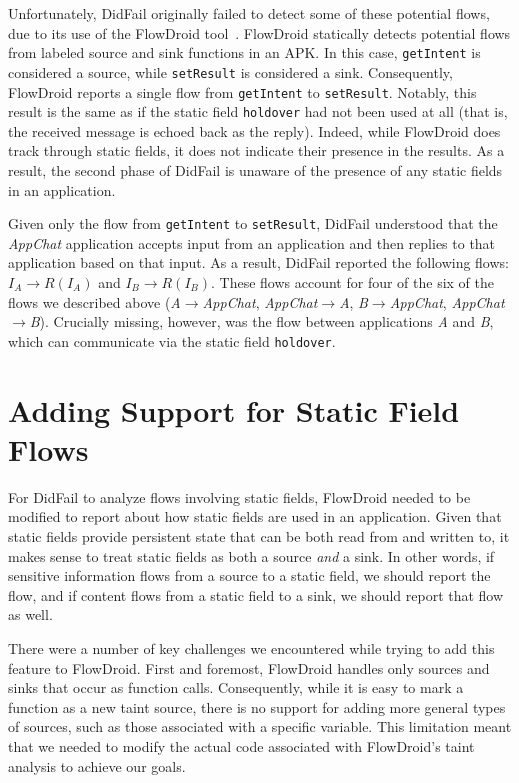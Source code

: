 Unfortunately, DidFail originally failed to detect some of these potential flows, due to its use of the FlowDroid tool~\cite{flowdroid}. FlowDroid statically detects potential flows from labeled source and sink functions in an APK. In this case, \texttt{getIntent} is considered a source, while \texttt{setResult} is considered a sink. Consequently, FlowDroid reports a single flow from \texttt{getIntent} to \texttt{setResult}. Notably, this result is the same as if the static field \texttt{holdover} had not been used at all (that is, the received message is echoed back as the reply). Indeed, while FlowDroid does track through static fields, it does not indicate their presence in the results. As a result, the second phase of DidFail is unaware of the presence of any static fields in an application.

Given only the flow from \texttt{getIntent} to \texttt{setResult}, DidFail understood that the \emph{AppChat} application accepts input from an application and then replies to that application based on that input. As a result, DidFail reported the following flows: $I_A\rightarrow R(I_A)$ and $I_B\rightarrow R(I_B)$. These flows account for four of the six of the flows we described above (\emph{A$\rightarrow$AppChat}, \emph{AppChat$\rightarrow$A}, \emph{B$\rightarrow$AppChat}, \emph{AppChat$\rightarrow$B}). Crucially missing, however, was the flow between applications \emph{A} and \emph{B}, which can communicate via the static field \texttt{holdover}. 

\section{Adding Support for Static Field Flows}

For DidFail to analyze flows involving static fields, FlowDroid needed to be modified to report about how static fields are used in an application. Given that static fields provide persistent state that can be both read from and written to, it makes sense to treat static fields as both a source \emph{and} a sink. In other words, if sensitive information flows from a source to a static field, we should report the flow, and if content flows from a static field to a sink, we should report that flow as well.

There were a number of key challenges we encountered while trying to add this feature to FlowDroid. First and foremost, FlowDroid handles only sources and sinks that occur as function calls. Consequently, while it is easy to mark a function as a new taint source, there is no support for adding more general types of sources, such as those associated with a specific variable. This limitation meant that we needed to modify the actual code associated with FlowDroid's taint analysis to achieve our goals.

